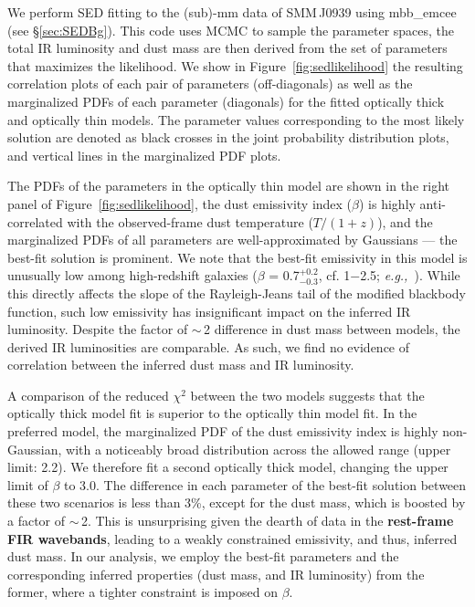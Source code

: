 \documentclass[iop, revtex4]{emulateapj}
\newcommand{\eg}{{\sl e.g.,~}}
\begin{document}

\appendix
We perform SED fitting to the (sub)-mm data of SMM\,J0939 using {\sc mbb\_emcee} (see \S \ref{sec:SEDBg}). This code uses MCMC to sample the parameter spaces, the total IR luminosity and dust mass are then derived from the set of parameters that maximizes the likelihood.
We show in Figure~\ref{fig:sedlikelihood} the resulting correlation plots of each pair of parameters (off-diagonals) as well as the marginalized PDFs of each parameter (diagonals) for the fitted optically thick and optically thin models.
The parameter values corresponding to the most likely solution are denoted as black crosses in the joint probability distribution plots, and vertical lines in the marginalized PDF plots. \par

The PDFs of the parameters in the optically thin model are shown in the right panel of Figure~\ref{fig:sedlikelihood}, the dust emissivity index ($\beta$) is highly anti-correlated with the observed-frame dust temperature ($T/(1+z)$), and the marginalized PDFs of all parameters are well-approximated by Gaussians --- the best-fit solution is prominent.
We note that the best-fit emissivity in this model is unusually low among high-redshift galaxies ($\beta$ = 0.7$^{+0.2}_{-0.3}$, cf. 1$-$2.5; \eg \citealt[][and references therein]{Casey12a}). While this directly affects the slope of the Rayleigh-Jeans tail of the modified blackbody function, such low emissivity has insignificant impact on the inferred IR luminosity.
Despite the factor of $\sim$\,2 difference
in dust mass
between models, the derived IR luminosities are comparable. As such, we find no evidence of correlation between the inferred dust mass and IR luminosity. 

A comparison of the reduced $\chi^2$ between the two models suggests that the optically thick model fit is superior to the optically thin model fit. In the preferred model, the marginalized PDF of the dust emissivity index is highly non-Gaussian, with a noticeably broad distribution across
the allowed range (upper limit: 2.2). We therefore fit a second optically thick model, changing the upper limit of $\beta$ to 3.0. The difference in each
parameter of the best-fit solution between these two scenarios is less than 3\%, except for the dust mass, which is boosted by a factor of $\sim$\,2. This is
unsurprising given the dearth of data in the {\bf rest-frame FIR wavebands}, leading to a weakly constrained emissivity, and thus, inferred dust mass.
In our analysis, we employ the best-fit parameters and the corresponding inferred properties (dust mass, and IR luminosity) from the former, where a tighter constraint is imposed on $\beta$.
\end{document}
